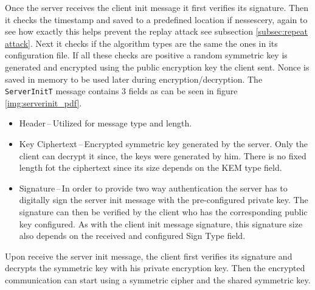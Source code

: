 Once the server receives the client init message it first verifies its signature. Then it checks the timestamp and saved to a predefined location if nessescery, again to see how exactly this helps prevent the replay attack see subsection \ref{subsec:repeat attack}. Next it checks if the algorithm types are the same the ones in its configuration file. If all these checks are positive a random symmetric key is generated and encrypted using the public encryption key the client sent. Nonce is saved in memory to be used later during encryption/decryption. The \texttt{ServerInitT} message contains 3 fields as can be seen in figure \ref{img:serverinit_pdf}.
\begin{itemize}
  \item Header\,--\,Utilized for message type and length.
  \item Key Ciphertext\,--\,Encrypted symmetric key generated by the server. Only the client can decrypt it since, the keys were generated by him. There is no fixed length fot the ciphertext since its size depends on the KEM type field.
  \item Signature\,--\,In order to provide two way authentication the server has to digitally sign the server init message with the pre-configured private key. The signature can then be verified by the client who has the corresponding public key configured. As with the client init message signature, this signature size also depends on the received and configured Sign Type field.
\end{itemize}

Upon receive the server init message, the client first verifies its signature and decrypts the symmetric key with his private encryption key. Then the encrypted communication can start using a symmetric cipher and the shared symmetric key.

